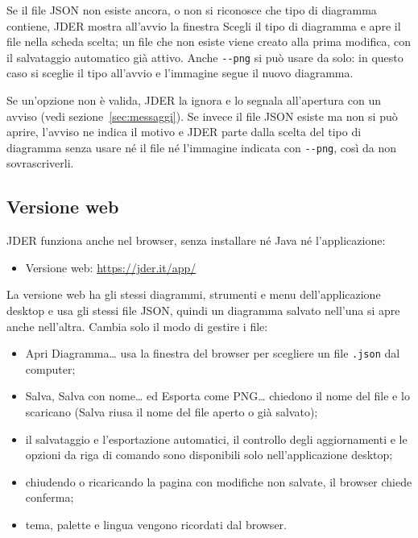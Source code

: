 \documentclass[a4paper,11pt]{article}
\newcommand\mediumweight{\fontseries{mb}\selectfont}
\newcommand\menu[1]{{\mediumweight\color{m3onprimarycontainer}#1}}
\newcommand\uielement[1]{{\mediumweight #1}}
\newcommand\jder{{\mediumweight JDER}}
\begin{document}
Se il file JSON non esiste ancora, o non si riconosce che tipo di diagramma contiene, \jder{}
mostra all'avvio la finestra \uielement{Scegli il tipo di diagramma} e apre il file nella scheda
scelta; un file che non esiste viene creato alla prima modifica, con il salvataggio automatico già
attivo. Anche \texttt{-{}-png} si può usare da solo: in questo caso si sceglie il tipo all'avvio e
l'immagine segue il nuovo diagramma.

Se un'opzione non è valida, \jder{} la ignora e lo segnala all'apertura con un avviso (vedi
sezione~\ref{sec:messaggi}). Se invece il file JSON esiste ma non si può aprire, l'avviso ne indica
il motivo e \jder{} parte dalla scelta del tipo di diagramma senza usare né il file né l'immagine
indicata con \texttt{-{}-png}, così da non sovrascriverli.

\subsection{Versione web}
\label{sec:web}

\jder{} funziona anche nel browser, senza installare né Java né l'applicazione:
\begin{itemize}
  \item Versione web: \url{https://jder.it/app/}
\end{itemize}

La versione web ha gli stessi diagrammi, strumenti e menu dell'applicazione desktop e usa gli
stessi file JSON, quindi un diagramma salvato nell'una si apre anche nell'altra. Cambia solo il
modo di gestire i file:

\begin{itemize}
  \item \menu{Apri Diagramma\ldots} usa la finestra del browser per scegliere un file
        \texttt{.json} dal computer;
  \item \menu{Salva}, \menu{Salva con nome\ldots} ed \menu{Esporta come PNG\ldots} chiedono il
        nome del file e lo scaricano (\menu{Salva} riusa il nome del file aperto o già salvato);
  \item il salvataggio e l'esportazione automatici, il controllo degli aggiornamenti e le opzioni
        da riga di comando sono disponibili solo nell'applicazione desktop;
  \item chiudendo o ricaricando la pagina con modifiche non salvate, il browser chiede conferma;
  \item tema, palette e lingua vengono ricordati dal browser.
\end{itemize}
\end{document}
